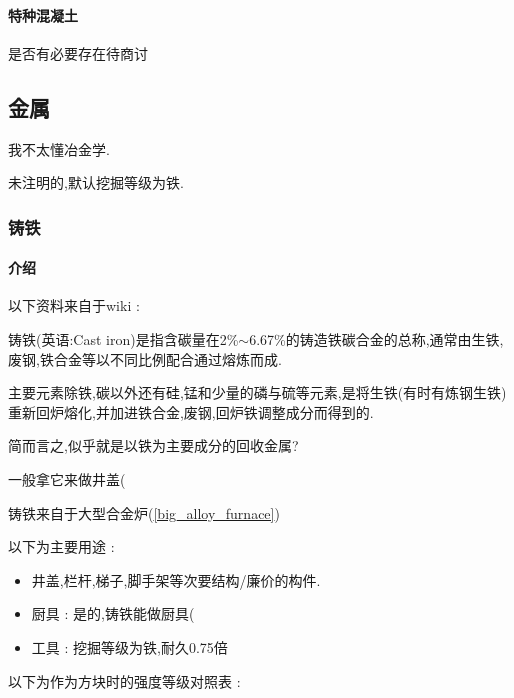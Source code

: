 {{{          \paragraph{特种混凝土}{
              是否有必要存在待商讨
          }
      }

  }

  \subsection{金属}{
      我不太懂冶金学.

      未注明的,默认挖掘等级为铁.

      \subsubsection{铸铁}{
          \paragraph{介绍}{
              以下资料来自于wiki :

              铸铁(英语:Cast iron)是指含碳量在2\%$\sim$6.67\%的铸造铁碳合金的总称,通常由生铁,废钢,铁合金等以不同比例配合通过熔炼而成.

              主要元素除铁,碳以外还有硅,锰和少量的磷与硫等元素,是将生铁(有时有炼钢生铁)重新回炉熔化,并加进铁合金,废钢,回炉铁调整成分而得到的.

              简而言之,似乎就是以铁为主要成分的回收金属?

              一般拿它来做井盖(
          }

          铸铁来自于大型合金炉({\ref{big_alloy_furnace}})

          以下为主要用途 :
          \begin{itemize}[itemsep=1pt]
              \item 井盖,栏杆,梯子,脚手架等次要结构/廉价的构件.
              \item 厨具 : 是的,铸铁能做厨具(
              \item 工具 : 挖掘等级为铁,耐久0.75倍
          \end{itemize}

          以下为作为方块时的强度等级对照表 :

}}}
